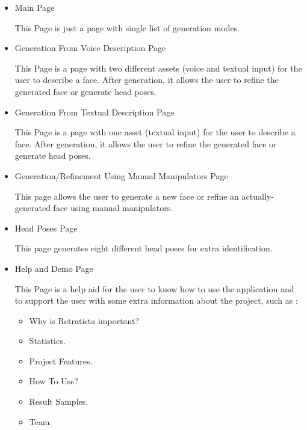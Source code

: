 \begin{itemize}
    \item Main Page
    
    This Page is just a page with single list of generation modes.



    \item Generation From Voice Description Page
    
    This Page is a page with two different assets (voice and textual input) for the user to describe a face. After generation, it allows the user to refine the generated face or generate head poses.
    
    
    
    \item Generation From Textual Description Page
    
    This Page is a page with one asset (textual input) for the user to describe a face. After generation, it allows the user to refine the generated face or generate head poses.
    
    
    
    
    \item Generation/Refinement Using Manual Manipulators Page
    
    This page allows the user to generate a new face or refine an actually-generated face using manual manipulators.
    



    \item Head Poses Page
    
    This page generates eight different head poses for extra identification.
    
    \item Help and Demo Page 
    
    This Page is a help aid for the user to know how to use the application and to support the user with some extra information about the project, such as :
    \begin{itemize}
        \item Why is Retratista important?
        \item Statistics.
        \item Project Features.
        \item How To Use?
        \item Result Samples.
        \item Team.
    \end{itemize}
    
\end{itemize}

